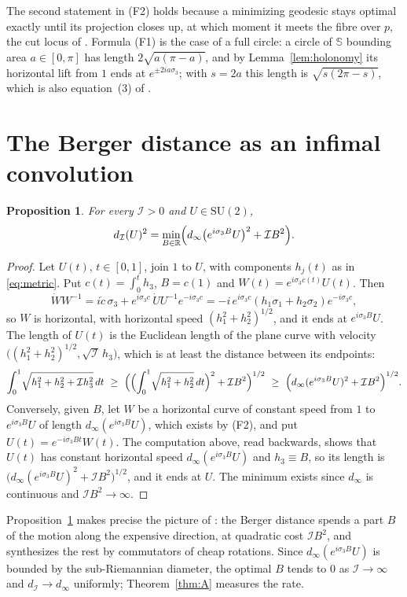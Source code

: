 \documentclass[11pt]{amsart}
\newtheorem{proposition}[theorem]{Proposition}
\theoremstyle{definition}
\newcommand{\RR}{\mathbb{R}}
\newcommand{\I}{\mathcal{I}}
\newcommand{\SU}{\mathrm{SU}(2)}
\newcommand{\Sp}{\mathbb{S}}
\newcommand{\dinf}{d_{\infty}}
\begin{document}
The second statement in (F2) holds because a minimizing geodesic stays optimal exactly until its projection closes up, at which moment it meets the fibre over $p$, the cut locus of \cite{BR08}. Formula (F1) is the case of a full circle: a circle of $\Sp$ bounding area $a\in[0,\pi]$ has length $2\sqrt{a(\pi-a)}$, and by Lemma~\ref{lem:holonomy} its horizontal lift from $1$ ends at $e^{\pm2ia\sigma_3}$; with $s=2a$ this length is $\sqrt{s(2\pi-s)}$, which is also equation~(3) of \cite{BFLS23}.

\section{The Berger distance as an infimal convolution}\label{sec:infconv}

\begin{proposition}\label{prop:infconv}
For every $\I>0$ and $U\in\SU$,
\[
d_\I(U)^2=\min_{B\in\RR}\Bigl(\dinf\bigl(e^{i\sigma_3B}U\bigr)^2+\I B^2\Bigr).
\]
\end{proposition}

\begin{proof}
Let $U(t)$, $t\in[0,1]$, join $1$ to $U$, with components $h_j(t)$ as in \eqref{eq:metric}. Put $c(t)=\int_0^th_3$, $B=c(1)$ and $W(t)=e^{i\sigma_3c(t)}U(t)$. Then
\[
\dot WW^{-1}=i\dot c\,\sigma_3+e^{i\sigma_3c}\,\dot UU^{-1}e^{-i\sigma_3c}
=-i\,e^{i\sigma_3c}(h_1\sigma_1+h_2\sigma_2)e^{-i\sigma_3c},
\]
so $W$ is horizontal, with horizontal speed $(h_1^2+h_2^2)^{1/2}$, and it ends at $e^{i\sigma_3B}U$. The length of $U(t)$ is the Euclidean length of the plane curve with velocity $\bigl((h_1^2+h_2^2)^{1/2},\sqrt{\I}\,h_3\bigr)$, which is at least the distance between its endpoints:
\[
\int_0^1\!\sqrt{h_1^2+h_2^2+\I h_3^2}\,dt\ \ge\ \Bigl(\Bigl(\int_0^1\!\sqrt{h_1^2+h_2^2}\,dt\Bigr)^2+\I B^2\Bigr)^{1/2}\ \ge\ \Bigl(\dinf(e^{i\sigma_3B}U)^2+\I B^2\Bigr)^{1/2}.
\]
Conversely, given $B$, let $W$ be a horizontal curve of constant speed from $1$ to $e^{i\sigma_3B}U$ of length $\dinf(e^{i\sigma_3B}U)$, which exists by (F2), and put $U(t)=e^{-i\sigma_3Bt}W(t)$. The computation above, read backwards, shows that $U(t)$ has constant horizontal speed $\dinf(e^{i\sigma_3B}U)$ and $h_3\equiv B$, so its length is $\bigl(\dinf(e^{i\sigma_3B}U)^2+\I B^2\bigr)^{1/2}$, and it ends at $U$. The minimum exists since $\dinf$ is continuous and $\I B^2\to\infty$.
\end{proof}

Proposition~\ref{prop:infconv} makes precise the picture of \cite{BFLS23}: the Berger distance spends a part $B$ of the motion along the expensive direction, at quadratic cost $\I B^2$, and synthesizes the rest by commutators of cheap rotations. Since $\dinf(e^{i\sigma_3B}U)$ is bounded by the sub-Riemannian diameter, the optimal $B$ tends to $0$ as $\I\to\infty$ and $d_\I\to\dinf$ uniformly; Theorem~\ref{thm:A} measures the rate.
\end{document}
